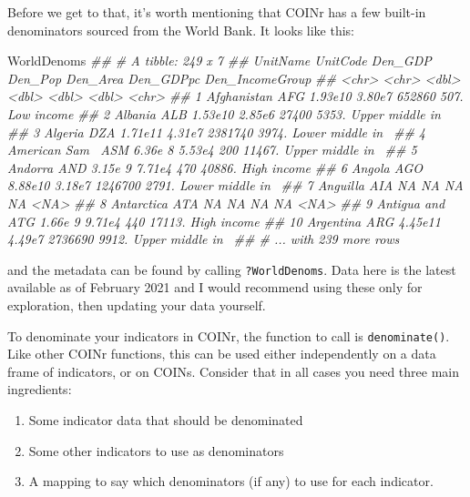 \documentclass[
]{book}
\newenvironment{Shaded}{\begin{snugshade}}{\end{snugshade}}
\newcommand{\CommentTok}[1]{\textcolor[rgb]{0.56,0.35,0.01}{\textit{#1}}}
\newcommand{\NormalTok}[1]{#1}
\providecommand{\tightlist}{%
  \setlength{\itemsep}{0pt}\setlength{\parskip}{0pt}}
\begin{document}
Before we get to that, it's worth mentioning that COINr has a few built-in denominators sourced from the World Bank. It looks like this:

\begin{Shaded}
\begin{Highlighting}[]
\NormalTok{WorldDenoms}
\CommentTok{## # A tibble: 249 x 7}
\CommentTok{##    UnitName      UnitCode    Den_GDP Den_Pop Den_Area Den_GDPpc Den_IncomeGroup }
\CommentTok{##    <chr>         <chr>         <dbl>   <dbl>    <dbl>     <dbl> <chr>           }
\CommentTok{##  1 Afghanistan   AFG         1.93e10  3.80e7   652860      507. Low income      }
\CommentTok{##  2 Albania       ALB         1.53e10  2.85e6    27400     5353. Upper middle in~}
\CommentTok{##  3 Algeria       DZA         1.71e11  4.31e7  2381740     3974. Lower middle in~}
\CommentTok{##  4 American Sam~ ASM         6.36e 8  5.53e4      200    11467. Upper middle in~}
\CommentTok{##  5 Andorra       AND         3.15e 9  7.71e4      470    40886. High income     }
\CommentTok{##  6 Angola        AGO         8.88e10  3.18e7  1246700     2791. Lower middle in~}
\CommentTok{##  7 Anguilla      AIA        NA       NA            NA       NA  <NA>            }
\CommentTok{##  8 Antarctica    ATA        NA       NA            NA       NA  <NA>            }
\CommentTok{##  9 Antigua and ~ ATG         1.66e 9  9.71e4      440    17113. High income     }
\CommentTok{## 10 Argentina     ARG         4.45e11  4.49e7  2736690     9912. Upper middle in~}
\CommentTok{## # ... with 239 more rows}
\end{Highlighting}
\end{Shaded}

and the metadata can be found by calling \texttt{?WorldDenoms}. Data here is the latest available as of February 2021 and I would recommend using these only for exploration, then updating your data yourself.

To denominate your indicators in COINr, the function to call is \texttt{denominate()}. Like other COINr functions, this can be used either independently on a data frame of indicators, or on COINs. Consider that in all cases you need three main ingredients:

\begin{enumerate}
\def\labelenumi{\arabic{enumi}.}
\tightlist
\item
  Some indicator data that should be denominated
\item
  Some other indicators to use as denominators
\item
  A mapping to say which denominators (if any) to use for each indicator.
\end{enumerate}
\end{document}
